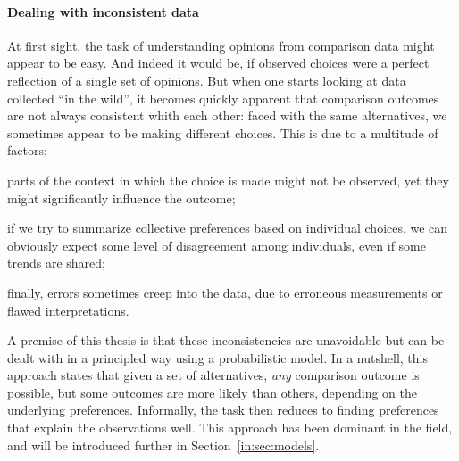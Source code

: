 \paragraph{Dealing with inconsistent data}
At first sight, the task of understanding opinions from comparison data might appear to be easy.
And indeed it would be, if observed choices were a perfect reflection of a single set of opinions.
But when one starts looking at data collected ``in the wild'', it becomes quickly apparent that comparison outcomes are not always consistent whith each other:
faced with the same alternatives, we sometimes appear to be making different choices.
This is due to a multitude of factors:
\begin{enuminline}
\item parts of the context in which the choice is made might not be observed, yet they might significantly influence the outcome;
\item if we try to summarize collective preferences based on individual choices, we can obviously expect some level of disagreement among individuals, even if some trends are shared;
\item finally, errors sometimes creep into the data, due to erroneous measurements or flawed interpretations.
\end{enuminline}
A premise of this thesis is that these inconsistencies are unavoidable but can be dealt with in a principled way using a probabilistic model.
In a nutshell, this approach states that given a set of alternatives, \emph{any} comparison outcome is possible, but some outcomes are more likely than others, depending on the underlying preferences.
Informally, the task then reduces to finding preferences that explain the observations well.
This approach has been dominant in the field, and will be introduced further in Section~\ref{in:sec:models}.


